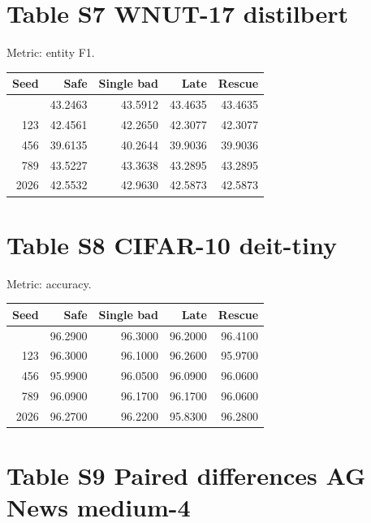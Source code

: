 \documentclass[11pt,a4paper]{article}
\begin{document}

\section{Table S7 WNUT-17 distilbert}\label{table-s7-wnut-17-distilbert}

Metric: entity F1.

\begin{longtable}[]{@{}rrrrr@{}}
\toprule\noalign{}
Seed & Safe & Single bad & Late & Rescue \\
\midrule\noalign{}
\endhead
\bottomrule\noalign{}
\endlastfoot
42 & 43.2463 & 43.5912 & 43.4635 & 43.4635 \\
123 & 42.4561 & 42.2650 & 42.3077 & 42.3077 \\
456 & 39.6135 & 40.2644 & 39.9036 & 39.9036 \\
789 & 43.5227 & 43.3638 & 43.2895 & 43.2895 \\
2026 & 42.5532 & 42.9630 & 42.5873 & 42.5873 \\
\end{longtable}


\section{Table S8 CIFAR-10 deit-tiny}\label{table-s8-cifar-10-deit-tiny}

Metric: accuracy.

\begin{longtable}[]{@{}rrrrr@{}}
\toprule\noalign{}
Seed & Safe & Single bad & Late & Rescue \\
\midrule\noalign{}
\endhead
\bottomrule\noalign{}
\endlastfoot
42 & 96.2900 & 96.3000 & 96.2000 & 96.4100 \\
123 & 96.3000 & 96.1000 & 96.2600 & 95.9700 \\
456 & 95.9900 & 96.0500 & 96.0900 & 96.0600 \\
789 & 96.0900 & 96.1700 & 96.1700 & 96.0600 \\
2026 & 96.2700 & 96.2200 & 95.8300 & 96.2800 \\
\end{longtable}


\section{Table S9 Paired differences AG News medium-4}\label{table-s9-paired-differences-ag-news-medium-4}
\end{document}

